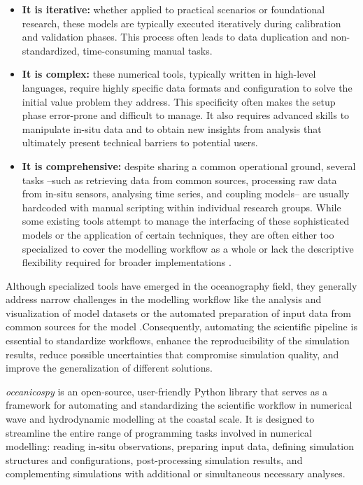\documentclass[preprint,12pt, a4paper]{elsarticle}
\begin{document}
\begin{itemize}
    \item \textbf{It is iterative:} whether applied to practical scenarios or foundational research, these models are typically executed iteratively during calibration and validation phases. This process often leads to data duplication and non-standardized, time-consuming manual tasks.

    \item \textbf{It is complex:} these numerical tools, typically written in high-level languages, require highly specific data formats and configuration to solve the initial value problem they address. This specificity often makes the setup phase error-prone and difficult to manage. It also requires advanced skills to manipulate in-situ data and to obtain new insights from analysis that ultimately present technical barriers to potential users.

    \item \textbf{It is comprehensive:} despite sharing a common operational ground, several tasks –such as retrieving data from common sources, processing raw data from in-situ sensors, analysing time series, and coupling models– are usually hardcoded with manual scripting within individual research groups. While some existing tools attempt to manage the interfacing of these sophisticated models or the application of certain techniques, they are often either too specialized to cover the modelling workflow as a whole \cite{xbeach_toolbox,wrap_swan} or lack the descriptive flexibility required for broader implementations \cite{oceanwaves_python}.
\end{itemize}

Although specialized tools have emerged in the oceanography field, they generally address narrow challenges in the modelling workflow like the analysis and visualization of model datasets \cite{Almansi_etal_2019} or the automated preparation of input data from common sources for the model \cite{Argaez_etal_2025}.Consequently, automating the scientific pipeline is essential to standardize workflows, enhance the reproducibility of the simulation results, reduce possible uncertainties that compromise simulation quality, and improve the generalization of different solutions.

\textit{oceanicospy} is an open-source, user-friendly Python library that serves as a framework for automating and standardizing the scientific workflow in numerical wave and hydrodynamic modelling at the coastal scale. It is designed to streamline the entire range of programming tasks involved in numerical modelling: reading in-situ observations, preparing input data, defining simulation structures and configurations, post-processing simulation results, and complementing simulations with additional or simultaneous necessary analyses.
\end{document}

